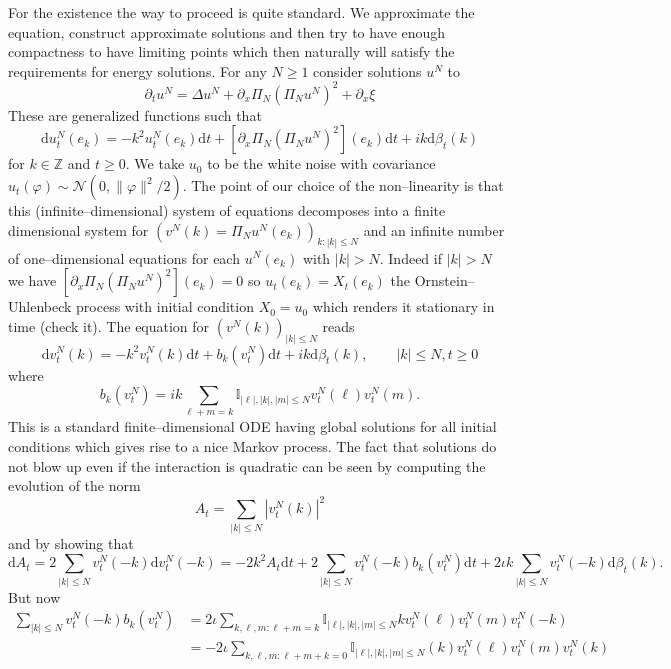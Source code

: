 \documentclass[a4paper,11pt]{article}
\newcommand{\mathd}{\mathrm{d}}
\begin{document}
For the existence the way to proceed is quite standard. We approximate the
equation, construct approximate solutions and then try to have enough
compactness to have limiting points which then naturally will satisfy the
requirements for energy solutions. For any $N \geqslant 1$ consider solutions
$u^N$ to
\[ \partial_t u^N = \Delta u^N + \partial_x \Pi_N (\Pi_N u^N)^2 + \partial_x
   \xi \]
These are generalized functions such that
\[ \mathd u^N_t (e_k) = - k^2 u^N_t (e_k) \mathd t + [\partial_x \Pi_N (\Pi_N
   u^N)^2] (e_k) \mathd t + ik \mathd \beta_t (k) \]
for $k \in \mathbb{Z}$ and $t \geqslant 0$. We take $u_0$ to be the white
noise with covariance $u_t (\varphi) \sim \mathcal{N} (0, \| \varphi \|^2 /
2)$. The point of our choice of the non--linearity is that this
(infinite--dimensional) system of equations decomposes into a finite
dimensional system for $(v^N (k) = \Pi_N u^N (e_k))_{k : | k | \leqslant N}$
and an infinite number of one--dimensional equations for each $u^N (e_k)$ with
$| k | > N$. Indeed if $| k | > N$ we have $[\partial_x \Pi_N (\Pi_N u^N)^2]
(e_k) = 0$ so $u_t (e_k) = X_t (e_k)$ the Ornstein--Uhlenbeck process with
initial condition $X_0 = u_0$ which renders it stationary in time (check it).
The equation for $(v^N (k))_{| k | \leqslant N}$ reads
\[ \mathd v^N_t (k) = - k^2 v^N_t (k) \mathd t + b_k (v^N_t) \mathd t + ik
   \mathd \beta_t (k), \hspace{2em} | k | \leqslant N, t \geqslant 0 \]
where
\[ b_k (v^N_t) = ik \sum_{\ell + m = k} \mathbb{I}_{| \ell |, | k |, | m |
   \leqslant N} v^N_t (\ell) v^N_t (m) . \]
This is a standard finite--dimensional ODE having global solutions for all
initial conditions which gives rise to a nice Markov process. The fact that
solutions do not blow up even if the interaction is quadratic can be seen
by computing the evolution of the norm
\[ A_t = \sum_{| k | \leqslant N} | v^N_t (k) |^2 \]
and by showing that
\[ \mathd A_t = 2 \sum_{| k | \leqslant N} v^N_t (- k) \mathd v^N_t (- k) = -
   2 k^2 A_t \mathd t + 2 \sum_{| k | \leqslant N} v^N_t (- k) b_k (v^N_t)
   \mathd t + 2 \iota k \sum_{| k | \leqslant N} v^N_t (- k) \mathd \beta_t
   (k). \]
But now
\begin{align*}
   \sum_{| k | \leqslant N} v^N_t (- k) b_k (v^N_t) & = 2 \iota \sum_{k, \ell, m : \ell + m = k} \mathbb{I}_{| \ell |, | k |, | m | \leqslant N} kv^N_t (\ell) v^N_t (m) v^N_t (- k) \\
    & = - 2 \iota \sum_{k, \ell, m : \ell + m + k = 0} \mathbb{I}_{| \ell |, | k |, | m | \leqslant N}  (k) v^N_t (\ell) v^N_t (m) v^N_t (k)
\end{align*}
\end{document}

